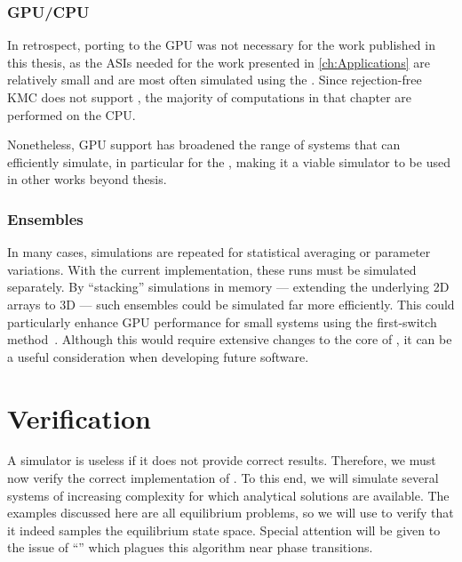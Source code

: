 \subsubsection{GPU/CPU}
In retrospect, porting \hotspice to the GPU was not necessary for the work published in this thesis, as the ASIs needed for the work presented in \cref{ch:Applications} are relatively small and are most often simulated using the .
Since rejection-free KMC does not support , the majority of computations in that chapter are performed on the CPU. \par
Nonetheless, GPU support has broadened the range of systems that \hotspice can efficiently simulate, in particular for the , making it a viable simulator to be used in other works beyond thesis.

\subsubsection{Ensembles}
In many cases, simulations are repeated for statistical averaging or parameter variations.
With the current \hotspice implementation, these runs must be simulated separately.
By ``stacking'' simulations in memory --- extending the underlying 2D arrays to 3D --- such ensembles could be simulated far more efficiently.
This could particularly enhance GPU performance for small systems using the first-switch method~\cite{GillespieParallel}.
Although this would require extensive changes to the core of \hotspice, it can be a useful consideration when developing future software.

\newpage %
\section{Verification}\label{sec:2:Verification}
A simulator is useless if it does not provide correct results.
Therefore, we must now verify the correct implementation of \hotspice.
To this end, we will simulate several systems of increasing complexity for which analytical solutions are available.
The examples discussed here are all equilibrium problems, so we will use  to verify that it indeed samples the equilibrium state space.
Special attention will be given to the issue of ``'' which plagues this algorithm near phase transitions.

